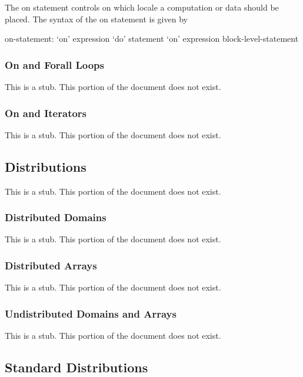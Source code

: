 The on statement controls on which locale a computation or data should
be placed.  The syntax of the on statement is given by
\begin{syntax}
on-statement:
  `on' expression `do' statement
  `on' expression block-level-statement
\end{syntax}

\subsubsection{On and Forall Loops}
\label{On_and_Forall_Loops}

This is a stub.  This portion of the document does not exist.

\subsubsection{On and Iterators}
\label{On_and_Iterators}

This is a stub.  This portion of the document does not exist.

\subsection{Distributions}
\label{Distributions}

This is a stub.  This portion of the document does not exist.

\subsubsection{Distributed Domains}
\label{Distributed_Domains}

This is a stub.  This portion of the document does not exist.

\subsubsection{Distributed Arrays}
\label{Distributed_Arrays}

This is a stub.  This portion of the document does not exist.

\subsubsection{Undistributed Domains and Arrays}
\label{Undistributed_Domains_and_Arrays}

This is a stub.  This portion of the document does not exist.

\subsection{Standard Distributions}
\label{Standard_Distributions}

